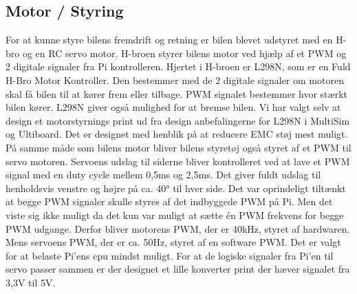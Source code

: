 \subsection{Motor / Styring}


For at kunne styre bilens fremdrift og retning er bilen blevet udstyret med en H-bro og en RC servo motor\cite{lib:wiki-RC-Servo}.
H-broen styrer bilens motor ved hjælp af et PWM og 2 digitale signaler fra Pi kontrolleren. 
Hjertet i H-broen er L298N\cite{lib:L298N_datablad}, som er en Fuld H-Bro Motor Kontroller. 
Den bestemmer med de 2 digitale signaler om motoren skal få bilen til at kører frem eller tilbage. 
PWM signalet bestemmer hvor stærkt bilen kører. 
L298N giver også mulighed for at bremse bilen.\newline 
Vi har valgt selv at design et motorstyrnings  print ud fra design anbefalingerne for L298N  i MultiSim og Ultiboard. 
Det er designet med henblik på at reducere EMC støj mest muligt.\newline
På samme måde som bilens motor bliver bilens styretøj også styret af et PWM til servo motoren. 
Servoens udslag til siderne bliver kontrolleret ved at lave et PWM signal med en duty cycle mellem 0,5ms og 2,5ms. 
Det giver fuldt udslag til henholdsvis venstre og højre på ca. 40\si{\degree} til hver side.
Det var oprindeligt tiltænkt at begge PWM signaler skulle styres af det indbyggede PWM på Pi. 
Men det viste sig ikke muligt da det kun var muligt at sætte én PWM frekvens for begge PWM udgange. 
Derfor bliver motorens PWM, der er 40kHz, styret af hardwaren. 
Mens servoens PWM, der er ca. 50Hz, styret af en software PWM. 
Det er valgt for at belaste Pi'ens cpu mindst muligt.
For at de logiske signaler fra Pi'en til servo passer sammen er der designet et lille konverter print der hæver signalet fra 3,3V til 5V.
